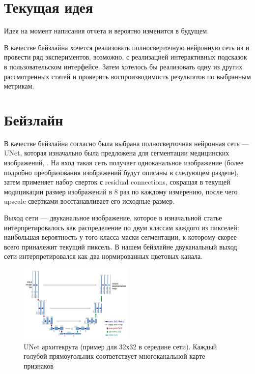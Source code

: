 \documentclass[14pt]{article}
\begin{document}
\section{Текущая идея}
Идея на момент написания отчета и вероятно изменится в будущем.

В качестве бейзлайна хочется реализовать полносверточную нейронную сеть из \cite{GuidedImageColorization} и провести ряд экспериментов, возможно,
с реализацией интерактивных подсказок в пользовательском интерфейсе. Затем хотелось бы реализовать одну из других рассмотренных статей и проверить
воспроизводимость результатов по выбранным метрикам.


\section{Бейзлайн}
В качестве бейзлайна согласно \cite{GuidedImageColorization} была выбрана полносверточная нейронная сеть --- UNet, которая изначально была
предложена для сегментации медицинских изображений, \cite{UNetForMedSegmentation}. На вход такая сеть получает одноканальное изображение
(более подробно преобразования изображений будут описаны в следующем разделе), затем применяет набор сверток с residual connections, сокращая
в текущей модицикации размер изображений в 8 раз по каждому измерению, после чего upscale свертками восстанавливает его исходные размер.

Выход сети --- двуканальное изображение, которое в изначальной статье интерпретировалось как распределение по двум классам каждого из пикселей:
наибольшая вероятность у того класса маски сегментации, к которому скорее всего приналежит текущий пиксель. В нашем бейзлайне двуканальный выход сети интерпретировался
как два нормированных цветовых канала.

\begin{figure}[H]
    \centering
    \includegraphics[width=0.5\textwidth]{resources/u_net_architecture.png}
    \caption{UNet архитекрута (пример для 32х32 в середине сети). Каждый голубой прямоугольник соответствует
    многоканальной карте признаков}
    \label{fig:id_figura}
\end{figure}
\end{document}

